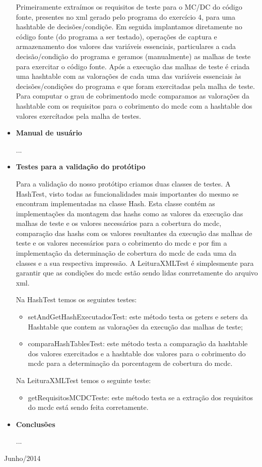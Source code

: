 \documentclass[a4paper,11pt]{article}
\newcommand{\sepitem}{\vspace{0.1in}\item}
\begin{document}
\begin{itemize}
Primeiramente extraímos os requisitos de teste para o MC/DC do código fonte, presentes no xml gerado 
pelo programa do exercício 4, para uma hashtable de decisões/condiçõe. Em seguida implantamos diretamente 
no código fonte (do programa a ser testado), operações de captura e armazenamento dos valores das variáveis 
essenciais, particulares a cada decisão/condição do programa e geramos (manualmente) as malhas de teste para 
exercitar o código fonte. Após a execução das malhas de teste é criada uma hashtable com as valorações de cada 
uma das variáveis essenciais às decisões/condições do programa e que foram exercitadas pela malha de teste. 
Para computar o grau de cobrimentodo mcdc comparamos as valorações da hashtable com os requisitos para o 
cobrimento do mcdc com a hashtable dos valores exercítados pela malha de testes.

\sepitem \textbf{Manual de usuário}
\setlength{\parindent}{5ex}

...

\sepitem \textbf{Testes para a validação do protótipo}
\setlength{\parindent}{5ex}

Para a validação do nosso protótipo criamos duas classes de testes. A HashTest, visto todas as funcionalidades 
mais importantes do mesmo se encontram implementadas na classe Hash. Esta classe contém as implementações da 
montagem das hashs como as valores da execução das malhas de teste e os valores necessários para a cobertura do
mcdc, comparação das hashs com os valores resultantes da execução das malhas de teste e os valores necessários 
para o cobrimento do mcdc e por fim a implementação da determinação de cobertura do mcdc de cada uma da classes
e a sua respectiva impressão. A LeituraXMLTest é simplesmente para garantir que as condições do mcdc estão sendo
lidas conrretamente do arquivo xml.

Na HashTest temos os seguintes testes:
\begin{itemize}
\item setAndGetHashExecutadosTest: este método testa os geters e seters da Hashtable que contem as valorações da 
execução das malhas de teste;
\item comparaHashTablesTest: este método testa a comparação da hashtable dos valores exercitados e a hashtable dos
valores para o cobrimento do mcdc para a determinação da porcentagem de cobertura do mcdc. 
\end{itemize}

Na LeituraXMLTest temos o seguinte teste:
\begin{itemize}
\item getRequisitosMCDCTeste: este método testa se a extração dos requisitos do mcdc está sendo feita corretamente. 
\end{itemize}

\sepitem \textbf{Conclusões}
\setlength{\parindent}{5ex}

...

\end{itemize}

\vfill

\raggedleft
{\sc Junho/2014}
\end{document}
